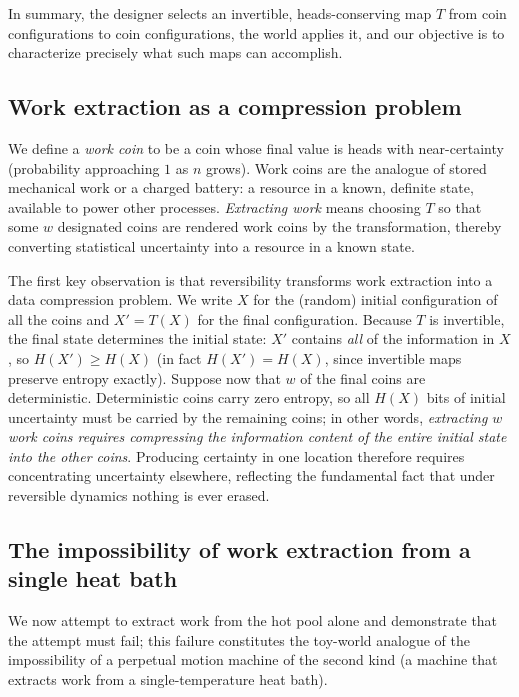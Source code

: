 \documentclass[11pt]{article}
\begin{document}
In summary, the designer selects an invertible, heads-conserving map $T$ from coin configurations to coin configurations, the world applies it, and our objective is to characterize precisely what such maps can accomplish.

\subsection{Work extraction as a compression problem}
\label{sec:workcompression}

We define a \emph{work coin} to be a coin whose final value is heads with near-certainty (probability approaching $1$ as $n$ grows). Work coins are the analogue of stored mechanical work or a charged battery: a resource in a known, definite state, available to power other processes. \emph{Extracting work} means choosing $T$ so that some $w$ designated coins are rendered work coins by the transformation, thereby converting statistical uncertainty into a resource in a known state.

The first key observation is that reversibility transforms work extraction into a data compression problem. We write $X$ for the (random) initial configuration of all the coins and $X' = T(X)$ for the final configuration. Because $T$ is invertible, the final state determines the initial state: $X'$ contains \emph{all} of the information in $X$, so $H(X') \ge H(X)$ (in fact $H(X') = H(X)$, since invertible maps preserve entropy exactly). Suppose now that $w$ of the final coins are deterministic. Deterministic coins carry zero entropy, so all $H(X)$ bits of initial uncertainty must be carried by the remaining coins; in other words, \emph{extracting $w$ work coins requires compressing the information content of the entire initial state into the other coins}. Producing certainty in one location therefore requires concentrating uncertainty elsewhere, reflecting the fundamental fact that under reversible dynamics nothing is ever erased.

\subsection{The impossibility of work extraction from a single heat bath}
\label{sec:onebath}

We now attempt to extract work from the hot pool alone and demonstrate that the attempt must fail; this failure constitutes the toy-world analogue of the impossibility of a perpetual motion machine of the second kind (a machine that extracts work from a single-temperature heat bath).
\end{document}
